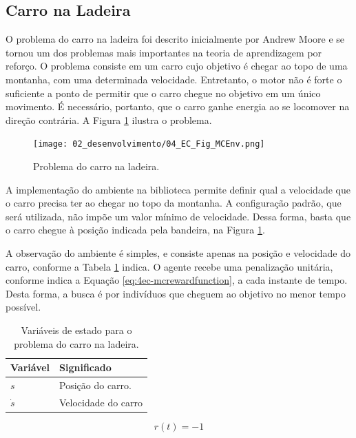 \subsection{Carro na Ladeira}\label{ssec:4ec-mc}

O problema do carro na ladeira foi descrito inicialmente por Andrew Moore \cite{moore1990efficient} e se tornou um dos problemas mais importantes na teoria de aprendizagem por reforço. O problema consiste em um carro cujo objetivo é chegar ao topo de uma montanha, com uma determinada velocidade. Entretanto, o motor não é forte o suficiente a ponto de permitir que o carro chegue no objetivo em um único movimento. É necessário, portanto, que o carro ganhe energia ao se locomover na direção contrária. A Figura \ref{fig:4ec-mcenv} ilustra o problema.

\begin{figure}[H]
	\centering
	\texttt{[image: 02\_desenvolvimento/04\_EC\_Fig\_MCEnv.png]}
	\caption{Problema do carro na ladeira.}
	\label{fig:4ec-mcenv}
\end{figure}

A implementação do ambiente na biblioteca permite definir qual a velocidade que o carro precisa ter ao chegar no topo da montanha. A configuração padrão, que será utilizada, não impõe um valor mínimo de velocidade. Dessa forma, basta que o carro chegue à posição indicada pela bandeira, na Figura \ref{fig:4ec-mcenv}.

A observação do ambiente é simples, e consiste apenas na posição e velocidade do carro, conforme a Tabela \ref{tab:4ec-mcvarestado} indica. O agente recebe uma penalização unitária, conforme indica a Equação \ref{eq:4ec-mcrewardfunction}, a cada instante de tempo. Desta forma, a busca é por indivíduos que cheguem ao objetivo no menor tempo possível.

\begin{table}[H]
	\centering
	\caption{Variáveis de estado para o problema do carro na ladeira.}
	\label{tab:4ec-mcvarestado}
	\begin{tabular}{l|l} \toprule
		{Variável} & {Significado}\\ \midrule
		{$s$} & {Posição do carro.} \\
		{$\dot{s}$} & {Velocidade do carro} \\
		\bottomrule
	\end{tabular}
\end{table}

\begin{equation}\label{eq:4ec-mcrewardfunction}
r(t) = -1
\end{equation}

